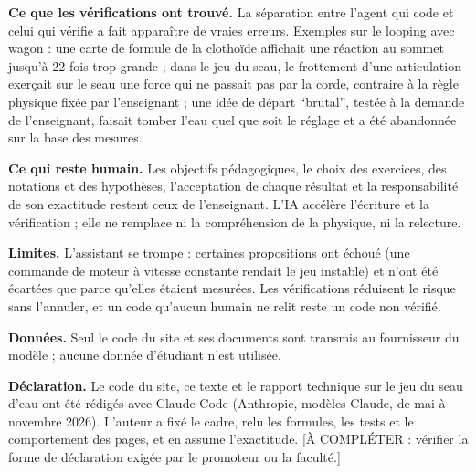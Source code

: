 \documentclass[10pt, a4paper]{article}
\begin{document}
\textbf{Ce que les vérifications ont trouvé.} La séparation entre l'agent qui
code et celui qui vérifie a fait apparaître de vraies erreurs. Exemples sur le
looping avec wagon : une carte de formule de la clothoïde affichait une
réaction au sommet jusqu'à 22 fois trop grande ; dans le jeu du seau, le
frottement d'une articulation exerçait sur le seau une force qui ne passait
pas par la corde, contraire à la règle physique fixée par l'enseignant ; une
idée de départ \enquote{brutal}, testée à la demande de l'enseignant, faisait
tomber l'eau quel que soit le réglage et a été abandonnée sur la base des
mesures.

\textbf{Ce qui reste humain.} Les objectifs pédagogiques, le choix des
exercices, des notations et des hypothèses, l'acceptation de chaque résultat
et la responsabilité de son exactitude restent ceux de l'enseignant. L'IA
accélère l'écriture et la vérification ; elle ne remplace ni la compréhension
de la physique, ni la relecture.

\textbf{Limites.} L'assistant se trompe : certaines propositions ont échoué
(une commande de moteur à vitesse constante rendait le jeu instable) et
n'ont été écartées que parce qu'elles étaient mesurées. Les vérifications
réduisent le risque sans l'annuler, et un code qu'aucun humain ne relit reste
un code non vérifié.

\textbf{Données.} Seul le code du site et ses documents sont transmis au
fournisseur du modèle ; aucune donnée d'étudiant n'est utilisée.

\textbf{Déclaration.} Le code du site, ce texte et le rapport technique sur le
jeu du seau d'eau ont été rédigés avec Claude Code (Anthropic, modèles Claude,
de mai à novembre 2026). L'auteur a fixé le cadre, relu les formules, les tests
et le comportement des pages, et en assume l'exactitude. [À COMPLÉTER :
vérifier la forme de déclaration exigée par le promoteur ou la faculté.]
\end{document}
